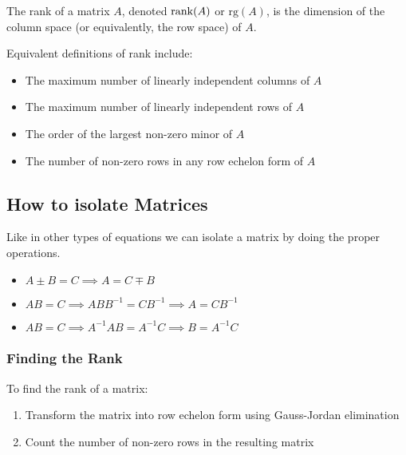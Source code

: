 The rank of a matrix \(A\), denoted \(\text{rank}(A)\) or \(\text{rg}(A)\), is the dimension of the column space (or equivalently, the row space) of \(A\).

Equivalent definitions of rank include:

\begin{itemize}
    
    \item The maximum number of linearly independent columns of \(A\)
    
    \item The maximum number of linearly independent rows of \(A\)
    
    \item The order of the largest non-zero minor of \(A\)
    
    \item The number of non-zero rows in any row echelon form of \(A\)

\end{itemize}

\subsection{How to isolate Matrices}

Like in other types of equations we can isolate a matrix by doing the proper operations.

\begin{itemize}

    \item \(A \pm B = C \implies A = C \mp B\) 

    \item \(AB = C \implies ABB^{-1} = CB^{-1}  \implies A = CB^{-1}\)

    \item \(AB = C \implies A^{-1}AB = A^{-1}C  \implies B = A^{-1}C\)

\end{itemize}

\subsubsection{Finding the Rank}

To find the rank of a matrix:

\begin{enumerate}

    \item Transform the matrix into row echelon form using Gauss-Jordan elimination

    \item Count the number of non-zero rows in the resulting matrix

\end{enumerate}

